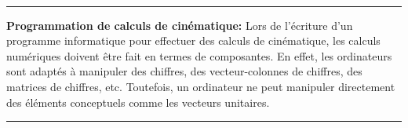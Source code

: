 \\ \noindent
\rule{\linewidth}{0.3mm}
\textbf{Programmation de calculs de cinématique:} Lors de l'écriture d'un programme informatique pour effectuer des calculs de cinématique, les calculs numériques doivent être fait en termes de composantes. En effet, les ordinateurs sont adaptés à manipuler des chiffres, des vecteur-colonnes de chiffres, des matrices de chiffres, etc. Toutefois, un ordinateur ne peut manipuler directement des éléments conceptuels comme les vecteurs unitaires.
\\ 
\rule{\linewidth}{0.3mm}



